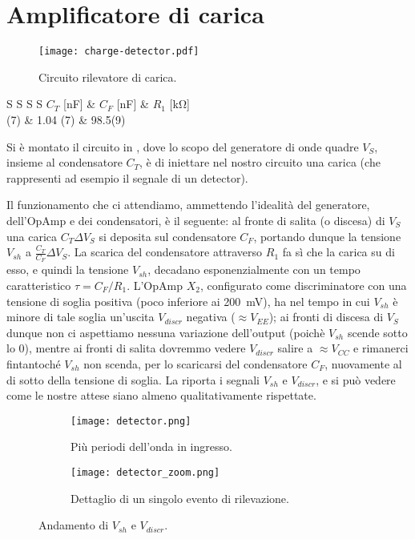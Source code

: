 \section{Amplificatore di carica}

\begin{figure}[h]
	\centering
	\texttt{[image: charge-detector.pdf]}
	\caption{Circuito rilevatore di carica.}
	\label{f:circ_detq}
\end{figure}

\begin{table}[h]
	\centering
	\begin{tabular}{S S S S}
		{$C_T$ [\si{\nano\farad}]} & {$C_F$ [\si{\nano\farad}]} & {$R_1$ [\si{\kohm}]} \\
		(7)	&	1.04 (7)	&	98.5(9) \\
	\end{tabular}
	\caption{Valori misurati per i componenti del circuito.}
	\label{t:det_meas}
\end{table}

Si è montato il circuito in , dove lo scopo del generatore di onde quadre $V_S$, insieme al condensatore $C_T$, è di iniettare nel nostro circuito una carica (che rappresenti ad esempio il segnale di un detector).

Il funzionamento che ci attendiamo, ammettendo l'idealità del generatore, dell'OpAmp e dei condensatori, è il seguente: al fronte di salita (o discesa) di $V_S$ una carica $C_T \Delta V_S $ si deposita sul condensatore $C_F$, portando dunque la tensione $V_{sh}$ a $\frac{C_T}{C_F} \Delta V_S $. La scarica del condensatore attraverso $R_1$ fa sì che la carica su di esso, e quindi la tensione $V_{sh}$, decadano esponenzialmente con un tempo caratteristico $\tau = C_F / R_1$. L'OpAmp $X_2$, configurato come discriminatore con una tensione di soglia positiva (poco inferiore ai \SI{200}{\mV}), ha nel tempo in cui $V_{sh}$ è minore di tale soglia un'uscita $V_{discr}$ negativa ($\approx V_{EE}$); ai fronti di discesa di $V_S$ dunque non ci aspettiamo nessuna variazione dell'output (poichè $V_{sh}$ scende sotto lo 0), mentre ai fronti di salita dovremmo vedere $V_{discr}$ salire a $\approx V_{CC}$ e rimanerci fintantoché $V_{sh}$ non scenda, per lo scaricarsi del condensatore $C_F$, nuovamente al di sotto della tensione di soglia. La  riporta i segnali $V_{sh}$ e $V_{discr}$, e si può vedere come le nostre attese siano almeno qualitativamente rispettate.

\begin{figure}[h]
	\begin{subfigure}{0.5 \textwidth}
		\centering
		\texttt{[image: detector.png]}
		\caption{Più periodi dell'onda in ingresso.}
	\end{subfigure}
	\begin{subfigure}{0.5 \textwidth}
		\centering
		\texttt{[image: detector\_zoom.png]}
		\caption{Dettaglio di un singolo evento di rilevazione.}
	\end{subfigure}
	\caption{Andamento di $V_{sh}$ e $V_{discr}$.}
	\label{f:det_norm}
\end{figure}

